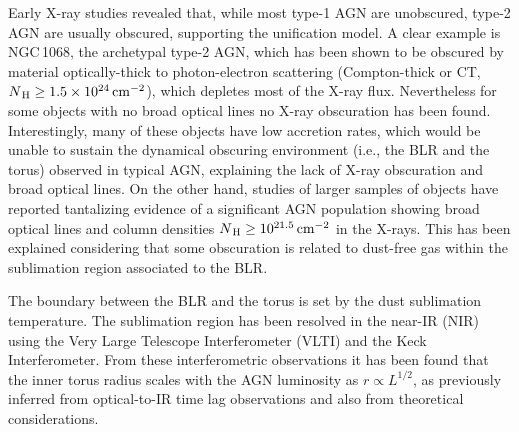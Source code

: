 \documentclass{natureprintstyle}
\begin{document}
Early X-ray studies revealed that, while most type-1 AGN are unobscured, type-2 AGN are usually obscured\cite{Awaki:1991rw}, supporting the unification model. {A clear example is NGC\,1068, the archetypal type-2 AGN, which has been shown to be obscured by material optically-thick to photon-electron scattering (Compton-thick or CT, $N_{\rm\,H}\geq 1.5\times 10^{24}\rm\,cm^{-2}$), which depletes most of the X-ray flux\cite{Matt:1997qy,Bauer:2015si}.} {Nevertheless for some objects with no broad optical lines no X-ray obscuration has been found\cite{Panessa:2002if}.} 
{Interestingly, many of these objects have low accretion rates, which would be unable to sustain the dynamical obscuring environment (i.e., the BLR and the torus) observed in typical AGN\cite{Nicastro:2000cq,Elitzur:2009hh}, explaining the lack of X-ray obscuration and broad optical lines.} On the other hand, studies of larger samples of objects have reported tantalizing evidence of a significant AGN population showing broad optical lines and column densities $N_{\rm\,H}\geq 10^{21.5}\rm\,cm^{-2}$ in the X-rays\cite{Merloni:2014wq}. {This has been explained considering that some obscuration is related to dust-free gas within the sublimation region associated to the BLR\cite{Davies:2015rw}.}





{The boundary between the BLR and the torus} is set by the dust sublimation temperature. The sublimation region has been resolved\cite{Kishimoto09,Weigelt12} in the near-IR (NIR) using the Very Large Telescope Interferometer (VLTI) 
and the Keck Interferometer. {From these interferometric observations it has been found that the inner torus radius scales with the AGN luminosity\cite{Kishimoto11} as $r\propto L^{1/2}$, as previously inferred from optical-to-IR time lag observations\cite{Suganuma06} and also from theoretical considerations\cite{Barvainis87}.} 
\end{document}
